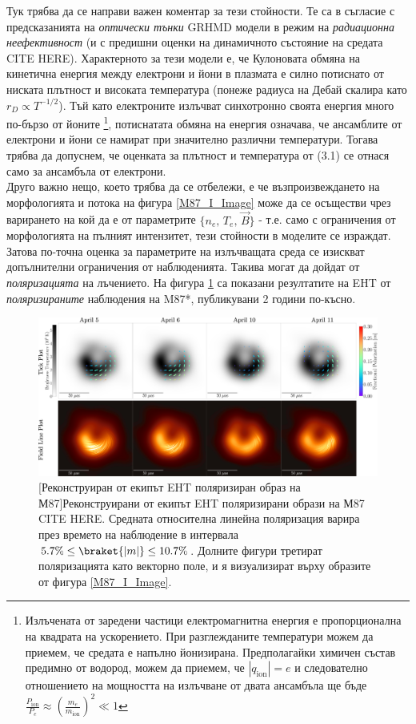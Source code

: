Тук трябва да се направи важен коментар за тези стойности. Те са в съгласие с предсказанията на \emph{оптически тънки} GRHMD модели в режим на \emph{радиационна неефективност} (и с предишни оценки на динамичното състояние на средата CITE HERE). Характерното за тези модели е, че Кулоновата обмяна на кинетична енергия между електрони и йони в плазмата е силно потиснато от ниската плътност и високата температура (понеже радиуса на Дебай скалира като $r_D \propto T^{-1/2}$). Тъй като електроните излъчват синхотронно своята енергия много по-бързо от йоните \footnote{ Излъчената от заредени частици електромагнитна енергия е пропорционална на квадрата на ускорението. При разглежданите температури можем да приемем, че средата е напълно йонизирана. Предполагайки химичен състав предимно от водород, можем да приемем, че $|q_{\text{ion}}| = e$ и следователно отношението на мощността на излъчване от двата ансамбъла ще бъде $\frac{P_{\text{ion}}}{P_e} \approx \left(\frac{m_e}{m_{\text{ion}}}\right)^2 \ll 1$
}, потиснатата обмяна на енергия означава, че ансамблите от електрони и йони се намират при значително различни температури. Тогава трябва да допуснем, че оценката за плътност и температура от (3.1) се отнася само за ансамбъла от електрони.\\

Друго важно нещо, което трябва да се отбележи, е че възпроизвеждането на морфологията и потока на фигура \ref{M87_I_Image} може да се осъществи чрез варирането на кой да е от параметрите $\{n_{e},\,T_{e},\, \vec{B}\}$ - т.е. само с ограничения от морфологията на пълният интензитет, тези стойности в моделите се израждат. Затова по-точна оценка за параметрите на излъчващата среда се изискват допълнителни ограничения от наблюденията. Такива могат да дойдат от \emph{поляризацията} на лъчението. На фигура \ref{M87_Pol_Image} са показани резултатите на EHT от \emph{поляризираните} наблюдения на M87*, публикувани 2 години по-късно.\\

 \begin{figure}[h!]{
 \centering
 \includegraphics[scale = 0.8]{M87_Polarization_overlay.jpg}\newline
 [Реконструиран от екипът EHT поляризиран образ на М87]{\small Реконструирани от екипът EHT поляризирани образи на М87 CITE HERE. Средната относителна линейна поляризация варира през времето на наблюдение в интервала $5.7\% \le \braket{|m|} \le 10.7\%$. Долните фигури третират поляризацията като векторно поле, и я визуализират върху образите от фигура \ref{M87_I_Image}.} 
 \label{M87_Pol_Image}}
 \end{figure}
 
